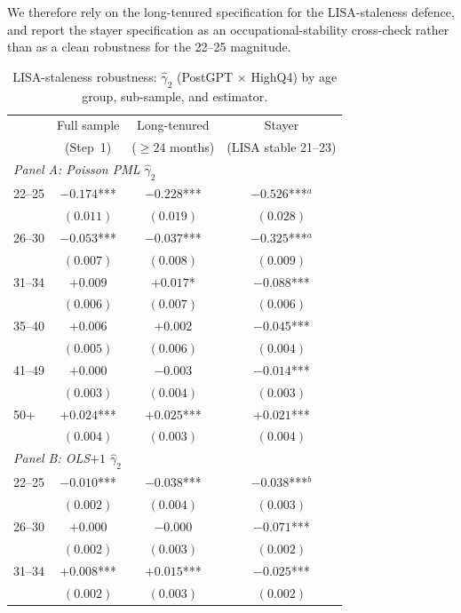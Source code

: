 \documentclass[preprint,12pt,authoryear]{elsarticle}
\begin{document}
We therefore rely on the long-tenured specification for the LISA-staleness defence, and report the stayer specification as an occupational-stability cross-check rather than as a clean robustness for the 22--25 magnitude.

\begin{table}[htbp]
\centering
\caption{LISA-staleness robustness: $\hat\gamma_2$ (PostGPT $\times$ HighQ4) by age group, sub-sample, and estimator.}
\label{tab:lisa_staleness_robust}
\footnotesize
\begin{tabular}{@{}lccc@{}}
\toprule
 & Full sample & Long-tenured & Stayer \\
 & (Step~1) & ($\geq 24$ months) & (LISA stable 21--23) \\
\midrule
\multicolumn{4}{l}{\emph{Panel A: Poisson PML $\hat\gamma_2$}} \\[2pt]
22--25 & $-0.174$*** & $-0.228$*** & $-0.526$***$^{a}$ \\
       & $(0.011)$    & $(0.019)$    & $(0.028)$ \\
26--30 & $-0.053$*** & $-0.037$*** & $-0.325$***$^{a}$ \\
       & $(0.007)$    & $(0.008)$    & $(0.009)$ \\
31--34 & $+0.009$    & $+0.017$*   & $-0.088$*** \\
       & $(0.006)$    & $(0.007)$    & $(0.006)$ \\
35--40 & $+0.006$    & $+0.002$    & $-0.045$*** \\
       & $(0.005)$    & $(0.006)$    & $(0.004)$ \\
41--49 & $+0.000$    & $-0.003$    & $-0.014$*** \\
       & $(0.003)$    & $(0.004)$    & $(0.003)$ \\
50+    & $+0.024$*** & $+0.025$*** & $+0.021$*** \\
       & $(0.004)$    & $(0.003)$    & $(0.004)$ \\[6pt]
\multicolumn{4}{l}{\emph{Panel B: OLS$+1$ $\hat\gamma_2$}} \\[2pt]
22--25 & $-0.010$*** & $-0.038$*** & $-0.038$***$^{b}$ \\
       & $(0.002)$    & $(0.004)$    & $(0.003)$ \\
26--30 & $+0.000$    & $-0.000$    & $-0.071$*** \\
       & $(0.002)$    & $(0.003)$    & $(0.002)$ \\
31--34 & $+0.008$*** & $+0.015$*** & $-0.025$*** \\
       & $(0.002)$    & $(0.003)$    & $(0.002)$ \\

\end{tabular}
\end{table}
\end{document}
